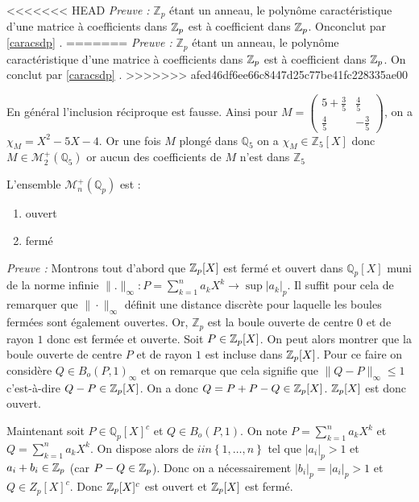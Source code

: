 <<<<<<< HEAD
\textit{Preuve : }  $\mathbb{Z}_p$ étant un anneau, le polynôme caractéristique d'une matrice à coefficients dans $ \mathbb {Z}_p $ est à coefficient dans $ \mathbb {Z}_p $. Onconclut par \ref{caracsdp} .
=======
\textit{Preuve : }  $\mathbb{Z}_p$ étant un anneau, le polynôme caractéristique d'une matrice à coefficients dans $ \mathbb {Z}_p $ est à coefficient dans $ \mathbb {Z}_p $. On conclut par \ref{caracsdp} .
>>>>>>> afed46df6ee66c8447d25c77be41fc228335ae00

\begin{remarque}
	En général l'inclusion réciproque est fausse. Ainsi pour $M = \begin{pmatrix} 5 + \frac{3}{5} & \frac{4}{5} \\ \frac{4}{5} & -\frac{3}{5} \end{pmatrix} $, on a $\chi_M = X^2  - 5 X - 4$. Or une fois $M$ plongé dans $\mathbb{Q}_5$ on a $\chi_M \in \mathbb{Z}_5[X]$ donc $M \in \mathcal{M}_2^+\left( \mathbb{Q}_5 \right)$ or aucun des coefficients de $M$ n'est dans $\mathbb{Z}_5 $
\end{remarque}

\begin{propriete}
	L'ensemble $\mathcal{M}_n^+\left( \mathbb{Q}_p \right)$  est :
	\begin{enumerate}[label = \textit{\roman*}.]
		\item ouvert
		\item fermé
	\end{enumerate}
\end{propriete}

\textit{Preuve :}  
Montrons tout d'abord que $ \mathbb {Z}_p [X]$ est fermé et ouvert dans $\mathbb{Q}_{ p }[X] $ muni de la norme infinie $\|.\|_\infty : P = \sum_{k=1}^{n} a_k X^k \to \sup |a_k|_p$. Il suffit pour cela de remarquer que $\|\cdot \|_\infty$  définit une distance discrète pour laquelle les boules fermées sont également ouvertes. Or, $\mathbb{Z}_p$ est la boule ouverte de centre $0$ et de rayon $1$ donc est fermée et ouverte.
\iffalse
Soit $P \in  \mathbb {Z}_p [X]$. On peut alors montrer que la boule ouverte de centre $P$ et de rayon $1$ est incluse dans $ \mathbb {Z}_p [X]$. Pour ce faire on considère $Q \in B_{o}\left( P,1 \right)_\infty $ et on remarque que cela signifie que $\|Q-P\|_\infty \le 1$ c'est-à-dire $Q-P \in  \mathbb {Z}_p [X]$. On a donc $Q = P + P-Q \in  \mathbb {Z}_p [X]$. 
$ \mathbb {Z}_p [X]$ est donc ouvert.

Maintenant soit $P \in \mathbb{Q}_{ p } [X]^c$ et $Q \in B_o\left( P, 1 \right) $. On note $P = \sum_{k=1}^{n} a_k X^k$ et $Q = \sum_{k=1}^{n} a_k X^k$. On dispose alors de $i in \left\{  1,\ldots,n \right\} $ tel que $|a_{i}|_p >1$ et $a_i + b_{i} \in  \mathbb {Z}_p $ (car $P-Q \in  \mathbb {Z}_p $). Donc on a nécessairement $|b_i|_p = |a_i|_p > 1$ et $Q \in Z_p[X]^c$.
Donc $ \mathbb {Z}_p [X]^c$ est ouvert et $ \mathbb {Z}_p [X]$ est fermé. 

